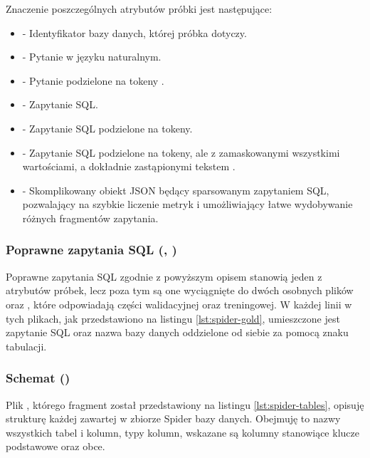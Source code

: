 Znaczenie poszczególnych atrybutów próbki jest następujące:
\begin{itemize}
    \item \textbf{} - Identyfikator bazy danych, której próbka dotyczy.
    \item \textbf{} - Pytanie w języku naturalnym.
    \item \textbf{} - Pytanie podzielone na tokeny .
    \item \textbf{} - Zapytanie SQL.
    \item \textbf{} - Zapytanie SQL podzielone na tokeny.
    \item \textbf{} - Zapytanie SQL podzielone na tokeny, ale z zamaskowanymi wszystkimi wartościami, a dokładnie zastąpionymi tekstem .
    \item \textbf{} - Skomplikowany obiekt JSON będący sparsowanym zapytaniem SQL, pozwalający na szybkie liczenie metryk i umożliwiający łatwe wydobywanie różnych fragmentów zapytania.
\end{itemize}

\subsubsection{Poprawne zapytania SQL (, )}
Poprawne zapytania SQL zgodnie z powyższym opisem stanowią jeden z atrybutów próbek, lecz poza tym są one wyciągnięte do dwóch osobnych plików  oraz , które odpowiadają części walidacyjnej oraz treningowej. W każdej linii w tych plikach, jak przedstawiono na listingu \ref{lst:spider-gold}, umieszczone jest zapytanie SQL oraz nazwa bazy danych oddzielone od siebie za pomocą znaku tabulacji.

\begin{minipage}{\linewidth}

\end{minipage}

\subsubsection{Schemat ()}
Plik , którego fragment został przedstawiony na listingu \ref{lst:spider-tables}, opisuję strukturę każdej zawartej w zbiorze Spider bazy danych. Obejmuję to nazwy wszystkich tabel i kolumn, typy kolumn, wskazane są kolumny stanowiące klucze podstawowe oraz obce.


